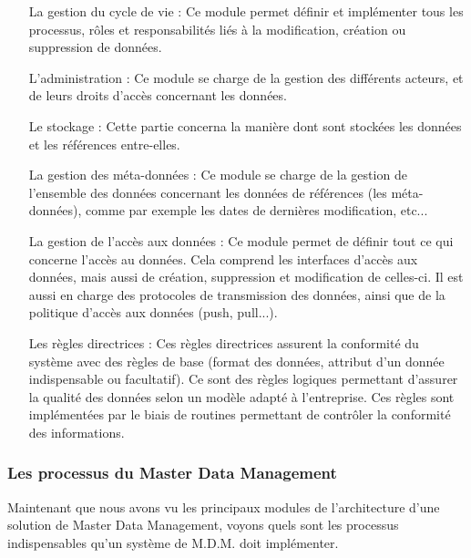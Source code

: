 \begin{itemize}

\item[La gestion du cycle de vie : ]
Ce module permet définir et implémenter tous les processus, rôles et responsabilités liés à la modification, création ou suppression de données.

\item[L'administration : ]
Ce module se charge de la gestion des différents acteurs, et de leurs droits d'accès concernant les données.

\item[Le stockage : ]
Cette partie concerna la manière dont sont stockées les données et les références entre-elles.

\item[La gestion des méta-données : ]
Ce module se charge de la gestion de l'ensemble des données concernant les données de références (les méta-données), comme par exemple les dates de dernières modification, etc...

\item[La gestion de l'accès aux données : ]
Ce module permet de définir tout ce qui concerne l'accès au données. Cela comprend les interfaces d'accès aux données, mais aussi de création, suppression et modification de celles-ci. Il est aussi en charge des protocoles de transmission des données, ainsi que de la politique d'accès aux données (push, pull...).

\item[Les règles directrices : ]
Ces règles directrices assurent la conformité du système avec des règles de base (format des données, attribut d'un donnée indispensable ou facultatif). Ce sont des règles logiques permettant d'assurer la qualité des données selon un modèle adapté à l'entreprise. Ces règles sont implémentées par le biais de routines permettant de contrôler la conformité des informations.

\end{itemize}

\subsubsection{Les processus du Master Data Management}

Maintenant que nous avons vu les principaux modules de l'architecture d'une solution de Master Data Management, voyons quels sont les processus indispensables qu'un système de M.D.M. doit implémenter.

